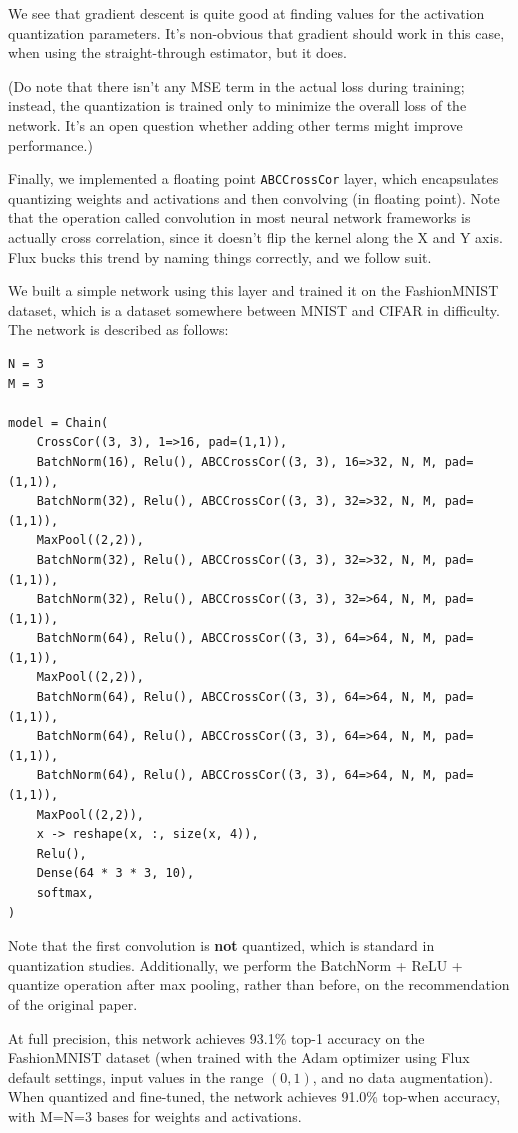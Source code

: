 \documentclass[12pt]{article}
\begin{document}
We see that gradient descent is quite good at finding values for the activation quantization parameters. It's non-obvious that gradient should work in this case, when using the straight-through estimator, but it does.

(Do note that there isn't any MSE term in the actual loss during training; instead, the quantization is trained only to minimize the overall loss of the network. It's an open question whether adding other terms might improve performance.)

Finally, we implemented a floating point \texttt{ABCCrossCor} layer, which encapsulates quantizing weights and activations and then convolving (in floating point). Note that the operation called convolution in most neural network frameworks is actually cross correlation, since it doesn't flip the kernel along the X and Y axis. Flux bucks this trend by naming things correctly, and we follow suit.

We built a simple network using this layer and trained it on the FashionMNIST \citep{FashionMNIST} dataset, which is a dataset somewhere between MNIST and CIFAR in difficulty. The network is described as follows:

\begin{verbatim}
N = 3
M = 3

model = Chain(
    CrossCor((3, 3), 1=>16, pad=(1,1)),
    BatchNorm(16), Relu(), ABCCrossCor((3, 3), 16=>32, N, M, pad=(1,1)),
    BatchNorm(32), Relu(), ABCCrossCor((3, 3), 32=>32, N, M, pad=(1,1)),
    MaxPool((2,2)),
    BatchNorm(32), Relu(), ABCCrossCor((3, 3), 32=>32, N, M, pad=(1,1)),
    BatchNorm(32), Relu(), ABCCrossCor((3, 3), 32=>64, N, M, pad=(1,1)),
    BatchNorm(64), Relu(), ABCCrossCor((3, 3), 64=>64, N, M, pad=(1,1)),
    MaxPool((2,2)),
    BatchNorm(64), Relu(), ABCCrossCor((3, 3), 64=>64, N, M, pad=(1,1)),
    BatchNorm(64), Relu(), ABCCrossCor((3, 3), 64=>64, N, M, pad=(1,1)),
    BatchNorm(64), Relu(), ABCCrossCor((3, 3), 64=>64, N, M, pad=(1,1)),
    MaxPool((2,2)),
    x -> reshape(x, :, size(x, 4)),
    Relu(),
    Dense(64 * 3 * 3, 10),
    softmax,
)
\end{verbatim}

Note that the first convolution is \textbf{not} quantized, which is standard in quantization studies. Additionally, we perform the BatchNorm + ReLU + quantize operation after max pooling, rather than before, on the recommendation of the original paper.

At full precision, this network achieves 93.1\% top-1 accuracy on the FashionMNIST dataset (when trained with the Adam optimizer using Flux default settings, input values in the range \((0, 1)\), and no data augmentation). When quantized and fine-tuned, the network achieves 91.0\% top-when accuracy, with M=N=3 bases for weights and activations.
\end{document}
